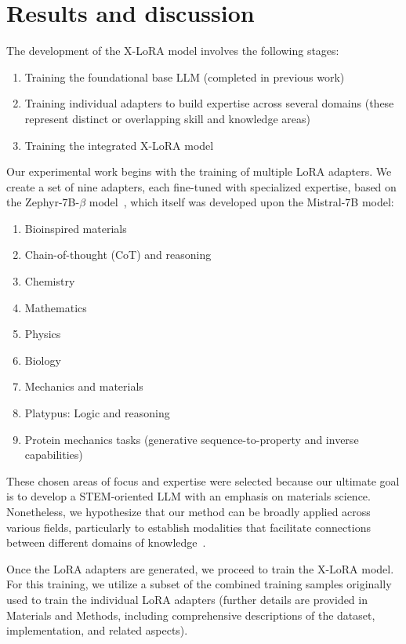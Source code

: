 \section{Results and discussion}

The development of the X-LoRA model involves the following stages:

\begin{enumerate}
    \item Training the foundational base LLM (completed in previous work) \item Training individual adapters to build expertise across several domains (these represent distinct or overlapping skill and knowledge areas) \item Training the integrated X-LoRA model
\end{enumerate}

Our experimental work begins with the training of multiple LoRA adapters. We create a set of nine adapters, each fine-tuned with specialized expertise, based on the Zephyr-7B-$\beta$ model~\cite{HuggingFaceH4/zephyr-7b-betaFace}, which itself was developed upon the Mistral-7B model\cite{Jiang2023Mistral7B}:

\begin{enumerate}
    \item Bioinspired materials \item Chain-of-thought (CoT) and reasoning \item Chemistry \item Mathematics \item Physics \item Biology \item Mechanics and materials \item Platypus: Logic and reasoning \item Protein mechanics tasks (generative sequence-to-property and inverse capabilities)
\end{enumerate}

These chosen areas of focus and expertise were selected because our ultimate goal is to develop a STEM-oriented LLM with an emphasis on materials science. Nonetheless, we hypothesize that our method can be broadly applied across various fields, particularly to establish modalities that facilitate connections between different domains of knowledge~\cite{Buehler2023MechGPTModalities,Buehler2023MeLMProblemsb}.

Once the LoRA adapters are generated, we proceed to train the X-LoRA model. For this training, we utilize a subset of the combined training samples originally used to train the individual LoRA adapters (further details are provided in Materials and Methods, including comprehensive descriptions of the dataset, implementation, and related aspects).

